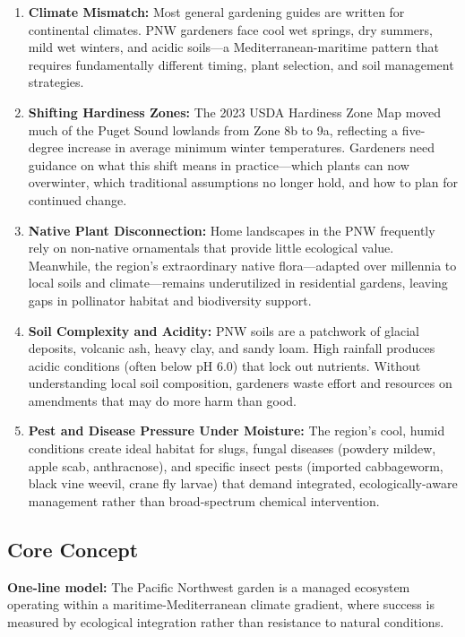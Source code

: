 \documentclass[11pt,letterpaper]{article}
\begin{document}
\begin{enumerate}[leftmargin=2em]
  \item \textbf{Climate Mismatch:} Most general gardening guides are written for continental climates. PNW gardeners face cool wet springs, dry summers, mild wet winters, and acidic soils---a Mediterranean-maritime pattern that requires fundamentally different timing, plant selection, and soil management strategies.

  \item \textbf{Shifting Hardiness Zones:} The 2023 USDA Hardiness Zone Map moved much of the Puget Sound lowlands from Zone 8b to 9a, reflecting a five-degree increase in average minimum winter temperatures. Gardeners need guidance on what this shift means in practice---which plants can now overwinter, which traditional assumptions no longer hold, and how to plan for continued change.

  \item \textbf{Native Plant Disconnection:} Home landscapes in the PNW frequently rely on non-native ornamentals that provide little ecological value. Meanwhile, the region's extraordinary native flora---adapted over millennia to local soils and climate---remains underutilized in residential gardens, leaving gaps in pollinator habitat and biodiversity support.

  \item \textbf{Soil Complexity and Acidity:} PNW soils are a patchwork of glacial deposits, volcanic ash, heavy clay, and sandy loam. High rainfall produces acidic conditions (often below pH 6.0) that lock out nutrients. Without understanding local soil composition, gardeners waste effort and resources on amendments that may do more harm than good.

  \item \textbf{Pest and Disease Pressure Under Moisture:} The region's cool, humid conditions create ideal habitat for slugs, fungal diseases (powdery mildew, apple scab, anthracnose), and specific insect pests (imported cabbageworm, black vine weevil, crane fly larvae) that demand integrated, ecologically-aware management rather than broad-spectrum chemical intervention.
\end{enumerate}

\subsection{Core Concept}

\begin{quotebox}
\textbf{One-line model:} The Pacific Northwest garden is a managed ecosystem operating within a maritime-Mediterranean climate gradient, where success is measured by ecological integration rather than resistance to natural conditions.
\end{quotebox}
\end{document}
